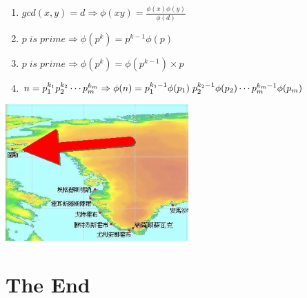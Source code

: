 \documentclass[11pt,twocolumn,a4paper]{article}
\begin{document}
\begin{enumerate}[1.]
\item $gcd(x,y)=d \Rightarrow \phi(xy) = \frac{\phi(x) \phi(y)}{\phi(d)}$
\item $p\; is\; prime \Rightarrow \phi(p^k) = p^{k-1} \phi(p)$
\item $p\; is\; prime \Rightarrow \phi(p^k) = \phi(p^{k-1}) \times p$
\item $n = p_{1}^{k_1} p_{2}^{k_2} \cdots p_{m}^{k_m}\\
\Rightarrow \phi(n) = p_{1}^{k_1-1}\phi(p_1)\; p_{2}^{k_2-1}\phi(p_2) \cdots p_{m}^{k_m-1}\phi(p_m)$
\end{enumerate}


\includegraphics[width=7cm]{圖勒.jpg}

\section*{The End}
\end{document}

